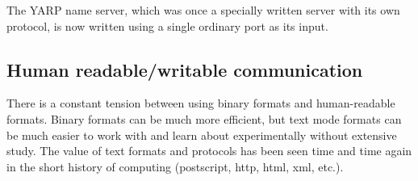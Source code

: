 The YARP name server, which was once a specially written server with
its own protocol, is now written using a single ordinary port as its
input.





\subsection{Human readable/writable communication}

There is a constant tension between using binary formats and
human-readable formats.  Binary formats can be much more efficient,
but text mode formats can be much easier to work with and learn about
experimentally without extensive study.  The value of text formats and
protocols has been seen time and time again in the short history of
computing (postscript, http, html, xml, etc.).

